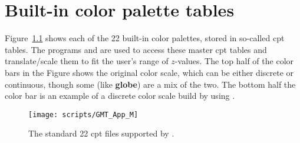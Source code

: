 %
%
\chapter{Built-in color palette tables}
\label{app:M}
\thispagestyle{headings}
%
Figure~\ref{fig:GMT_App_M} shows each of the 22 built-in color palettes,
stored in so-called cpt tables.
The programs  and  are used to access these master cpt tables
and translate/scale them to fit the user's range of $z$-values.
The top half of the color bars in the Figure shows the original color scale, which can be either discrete or
continuous, though some (like \textbf{globe}) are a mix of the two.
The bottom half the color bar is an example of a discrete color scale build by using
 .
%
\begin{figure}[h]
\centering
\texttt{[image: scripts/GMT\_App\_M]}
\caption{The standard 22 cpt files supported by \gmt.}
\label{fig:GMT_App_M}
\end{figure}

